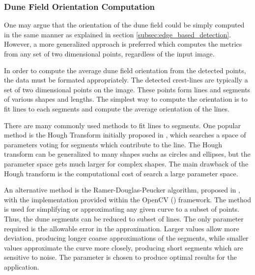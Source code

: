 \subsubsection{Dune Field Orientation Computation}
One may argue that the orientation of the dune field could be simply computed in the same manner as explained in section \ref{subsec:edge_based_detection}. However, a more generalized approach is preferred which computes the metrics from any set of two dimensional points, regardless of the input image. 

In order to compute the average dune field orientation from the detected points, the data must be formated appropriately. The detected crest-lines are typically a set of two dimensional points on the image. These points form lines and segments of various shapes and lengths. The simplest way to compute the orientation is to fit lines to each segments and compute the average orientation of the lines.

There are many commonly used methods to fit lines to segments. One popular method is the Hough Transform initially proposed in \cite{hough-1959-paper,hough-1962-patent,hough-duda-1972-paper}, which searches a space of parameters voting for segments which contribute to the line. The Hough transform can be generalized to many shapes suchs as circles and ellipses, but the parameter space gets much larger for complex shapes. The main drawback of the Hough transform is the computational cost of search a large parameter space.

An alternative method is the Ramer-Douglas-Peucker algorithm, proposed in \cite{ramer-1972-paper,douglas-peucker-1973-paper,douglas-hershberger-snoeyink-1992-paper}, with the implementation provided within the OpenCV (\cite{opencv_library}) framework. The method is used for simplifying or approximating any given curve to a subset of points. Thus, the dune segments can be reduced to subset of lines. The only parameter required is the allowable error in the approximation. Larger values allow more deviation, producing longer coarse approximations of the segments, while smaller values approximate the curve more closely, producing short segments which are sensitive to noise. The parameter is chosen to produce optimal results for the application.


